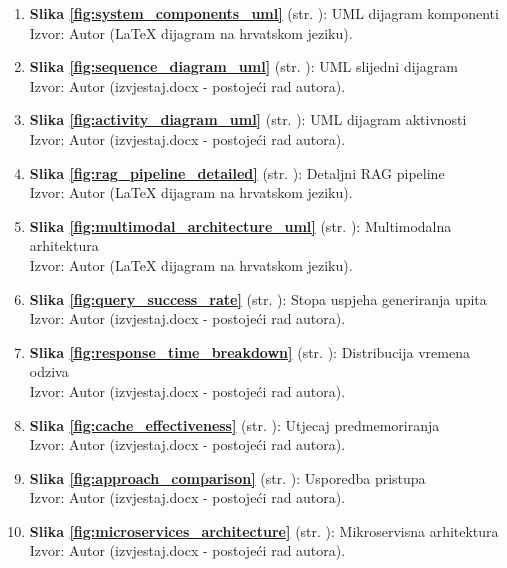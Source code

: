 \begin{enumerate}
\item \textbf{Slika \ref{fig:system_components_uml}} (str. \pageref{fig:system_components_uml}): UML dijagram komponenti \\
Izvor: Autor (LaTeX dijagram na hrvatskom jeziku).

\item \textbf{Slika \ref{fig:sequence_diagram_uml}} (str. \pageref{fig:sequence_diagram_uml}): UML slijedni dijagram \\
Izvor: Autor (izvjestaj.docx - postojeći rad autora).

\item \textbf{Slika \ref{fig:activity_diagram_uml}} (str. \pageref{fig:activity_diagram_uml}): UML dijagram aktivnosti \\
Izvor: Autor (izvjestaj.docx - postojeći rad autora).

\item \textbf{Slika \ref{fig:rag_pipeline_detailed}} (str. \pageref{fig:rag_pipeline_detailed}): Detaljni RAG pipeline \\
Izvor: Autor (LaTeX dijagram na hrvatskom jeziku).

\item \textbf{Slika \ref{fig:multimodal_architecture_uml}} (str. \pageref{fig:multimodal_architecture_uml}): Multimodalna arhitektura \\
Izvor: Autor (LaTeX dijagram na hrvatskom jeziku).

\item \textbf{Slika \ref{fig:query_success_rate}} (str. \pageref{fig:query_success_rate}): Stopa uspjeha generiranja upita \\
Izvor: Autor (izvjestaj.docx - postojeći rad autora).

\item \textbf{Slika \ref{fig:response_time_breakdown}} (str. \pageref{fig:response_time_breakdown}): Distribucija vremena odziva \\
Izvor: Autor (izvjestaj.docx - postojeći rad autora).

\item \textbf{Slika \ref{fig:cache_effectiveness}} (str. \pageref{fig:cache_effectiveness}): Utjecaj predmemoriranja \\
Izvor: Autor (izvjestaj.docx - postojeći rad autora).

\item \textbf{Slika \ref{fig:approach_comparison}} (str. \pageref{fig:approach_comparison}): Usporedba pristupa \\
Izvor: Autor (izvjestaj.docx - postojeći rad autora).

\item \textbf{Slika \ref{fig:microservices_architecture}} (str. \pageref{fig:microservices_architecture}): Mikroservisna arhitektura \\
Izvor: Autor (izvjestaj.docx - postojeći rad autora).

\end{enumerate}

